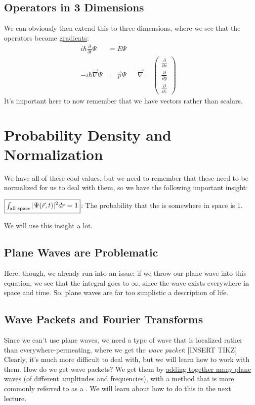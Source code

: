           \subsection{Operators in 3 Dimensions}
              We can obviously then extend this to three dimensions, where we see that the operators become \underline{gradients}:
                \begin{align*}
                    i\hbar\frac{\partial}{\partial t}\Psi &= E\Psi\\
                    -i\hbar\vec{\nabla}\Psi &= \vec{p}\Psi &&\vec{\nabla} = \begin{pmatrix}\frac{\partial}{\partial x}\\\frac{\partial}{\partial y}\\\frac{\partial}{\partial z}\end{pmatrix}
                \end{align*}
                It's important here to now remember that we have vectors rather than scalars.
        \section{Probability Density and Normalization}
            We have all of these cool values, but we need to remember that these need to be normalized for us to deal with them, so we have the following important insight:
            \begin{insight*}{}{}
              $\fbox{$\int_{\text{all space}}|\Psi(\vec{r},t)|^2dr = 1$}$: The probability that the  is somewhere in space is $1$.
            \end{insight*}
            We will use this insight a lot.

            \subsection{Plane Waves are Problematic}
                Here, though, we already run into an issue: if we throw our plane wave into this equation, we see that the integral goes to $\infty$, since the wave exists everywhere in space and time. So, plane waves are far too simplistic a description of life.
            \subsection{Wave Packets and Fourier Transforms}
                Since we can't use plane waves, we need a type of wave that is localized rather than everywhere-permeating, where we get the \textit{wave packet}: [INSERT TIKZ]
                Clearly, it's much more difficult to deal with, but we will learn how to work with them. How do we get wave packets? We get them by \underline{adding together many plane waves} (of different amplitudes and frequencies), with a method that is more commonly referred to as a . We will learn about how to do this in the next lecture.